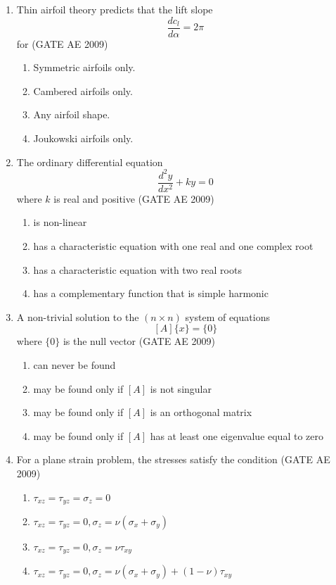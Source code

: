 \documentclass[journal,12pt,onecolumn]{IEEEtran}
\theoremstyle{remark}
\begin{document}
\begin{flushleft}
\begin{enumerate}
\item 
Thin airfoil theory predicts that the lift slope 
\[
\frac{dc_l}{d\alpha} = 2\pi
\]
for
\hfill(GATE AE 2009)
\begin{multicols}{2}
\begin{enumerate}
\item Symmetric airfoils only.
\item Cambered airfoils only.
\item Any airfoil shape.
\item Joukowski airfoils only.
\end{enumerate}
\end{multicols}

\item 
The ordinary differential equation 
\[
\frac{d^2 y}{dx^2} + ky = 0
\]
where \(k\) is real and positive
\hfill(GATE AE 2009)

\begin{enumerate}
\item is non-linear
\item has a characteristic equation with one real and one complex root
\item has a characteristic equation with two real roots
\item has a complementary function that is simple harmonic
\end{enumerate}


\item 
A non-trivial solution to the \( (n \times n) \) system of equations 
\[
[A]\{x\} = \{0\}
\]
where \( \{0\} \) is the null vector
\hfill(GATE AE 2009)
\begin{enumerate}
\item can never be found
\item may be found only if \([A]\) is not singular
\item may be found only if \([A]\) is an orthogonal matrix
\item may be found only if \([A]\) has at least one eigenvalue equal to zero
\end{enumerate}
\item 
For a plane strain problem, the stresses satisfy the condition
\hfill(GATE AE 2009)
\begin{enumerate}
\item \(\tau_{xz} = \tau_{yz} = \sigma_z = 0\)
\item \(\tau_{xz} = \tau_{yz} = 0, \sigma_z = \nu (\sigma_x + \sigma_y)\)
\item \(\tau_{xz} = \tau_{yz} = 0, \sigma_z = \nu \tau_{xy}\)
\item \(\tau_{xz} = \tau_{yz} = 0, \sigma_z = \nu (\sigma_x + \sigma_y) + (1 - \nu)\tau_{xy}\)
\end{enumerate}


\end{enumerate}
\end{flushleft}
\end{document}
